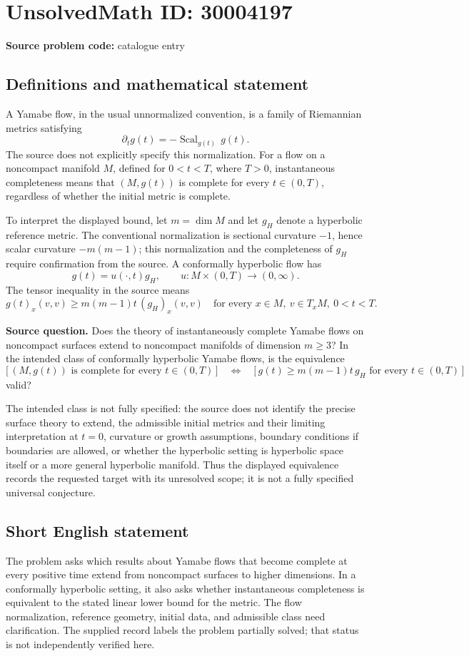 \documentclass[11pt]{article}
\begin{document}
\section*{UnsolvedMath ID: 30004197}
\textbf{Source problem code:} catalogue entry
\subsection{Definitions and mathematical statement}
A Yamabe flow, in the usual unnormalized convention, is a family of Riemannian metrics satisfying
\[
\partial_t g(t)=-\operatorname{Scal}_{g(t)}\,g(t).
\]
The source does not explicitly specify this normalization. For a flow on a noncompact manifold \(M\), defined for \(0<t<T\), where \(T>0\), instantaneous completeness means that \((M,g(t))\) is complete for every \(t\in(0,T)\), regardless of whether the initial metric is complete.

To interpret the displayed bound, let \(m=\dim M\) and let \(g_H\) denote a hyperbolic reference metric. The conventional normalization is sectional curvature \(-1\), hence scalar curvature \(-m(m-1)\); this normalization and the completeness of \(g_H\) require confirmation from the source. A conformally hyperbolic flow has
\[
g(t)=u(\cdot,t)g_H,\qquad u:M\times(0,T)\longrightarrow(0,\infty).
\]
The tensor inequality in the source means
\[
g(t)_x(v,v)\geq m(m-1)t\,(g_H)_x(v,v)
\quad\text{for every }x\in M,\ v\in T_xM,\ 0<t<T.
\]

\textbf{Source question.} Does the theory of instantaneously complete Yamabe flows on noncompact surfaces extend to noncompact manifolds of dimension \(m\geq3\)? In the intended class of conformally hyperbolic Yamabe flows, is the equivalence
\[
\bigl[\,(M,g(t))\text{ is complete for every }t\in(0,T)\,\bigr]
\quad\Longleftrightarrow\quad
\bigl[\,g(t)\geq m(m-1)t\,g_H\text{ for every }t\in(0,T)\,\bigr]
\]
valid?

The intended class is not fully specified: the source does not identify the precise surface theory to extend, the admissible initial metrics and their limiting interpretation at \(t=0\), curvature or growth assumptions, boundary conditions if boundaries are allowed, or whether the hyperbolic setting is hyperbolic space itself or a more general hyperbolic manifold. Thus the displayed equivalence records the requested target with its unresolved scope; it is not a fully specified universal conjecture.
\subsection{Short English statement}
The problem asks which results about Yamabe flows that become complete at every positive time extend from noncompact surfaces to higher dimensions. In a conformally hyperbolic setting, it also asks whether instantaneous completeness is equivalent to the stated linear lower bound for the metric. The flow normalization, reference geometry, initial data, and admissible class need clarification. The supplied record labels the problem partially solved; that status is not independently verified here.
\end{document}
